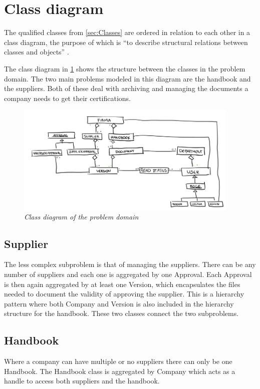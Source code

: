 \section{Class diagram} \label{sec:classdiagram}
The qualified classes from \cref{sec:Classes} are ordered in relation to each other in a class diagram, the purpose of which is ``to describe structural relations between classes and objects'' \citep[p.~71]{Rod-Aalborg}.

The class diagram in \cref{fig:ClassDiagram} shows the structure between the classes in the problem domain.
The two main problems modeled in this diagram are the handbook and the suppliers.
Both of these deal with archiving and managing the documents a company needs to get their certifications.


\begin{figure}[H]
	\centering
	\includegraphics[width=0.95\textwidth]{billeder/classDiagram.png}
	\caption{\textit{Class diagram of the problem domain
	}\label{fig:ClassDiagram}}
\end{figure}

\subsection{Supplier}
The less complex subproblem is that of managing the suppliers.
There can be any number of suppliers and each one is aggregated by one Approval.
Each Approval is then again aggregated by at least one Version, which encapsulates the files needed to document the validity of approving the supplier.
This is a hierarchy pattern where both Company and Version is also included in the hierarchy structure for the handbook.
These two classes connect the two subproblems.

\subsection{Handbook}
Where a company can have multiple or no suppliers there can only be one Handbook.
The Handbook class is aggregated by Company which acts as a handle to access both suppliers and the handbook.

